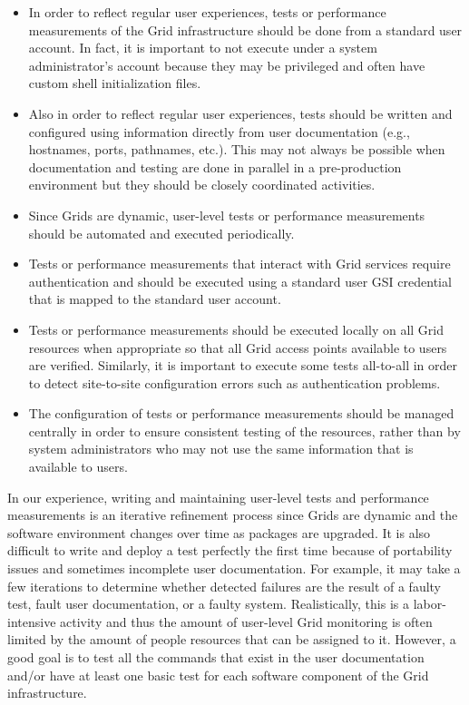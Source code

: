 \documentclass[times,10pt,twocolumn]{article}
\begin{document}
\begin{itemize}

\item In order to reflect regular user experiences, tests or performance
measurements of the Grid infrastructure should be done from a standard user
account.  In fact, it is important to not execute under a system
administrator's account because they may be privileged and often have custom
shell initialization files.

\item Also in order to reflect regular user experiences, tests should be
written and configured using information directly from user documentation
(e.g., hostnames, ports, pathnames, etc.).  This may not always be possible
when documentation and testing are done in parallel in a pre-production
environment but they should be closely coordinated activities. 

\item Since Grids are dynamic, user-level tests or performance measurements
should be automated and executed periodically.

\item Tests or performance measurements that interact with Grid services
require authentication and should be executed using a standard user GSI
credential that is mapped to the standard user account.  

\item Tests or performance measurements should be executed locally on all Grid
resources when appropriate so that all Grid access points available to users
are verified.  Similarly, it is important to execute some tests all-to-all
in order to detect site-to-site configuration errors such as authentication
problems.

\item The configuration of tests or performance measurements should be managed
centrally in order to ensure consistent testing of the resources, rather than
by system administrators who may not use the same information that is
available to users.

\end{itemize}

\noindent In our experience, writing and maintaining user-level tests and
performance measurements is an iterative refinement process since Grids are
dynamic and the software environment changes over time as packages are
upgraded.  It is also difficult to write and deploy a test perfectly the first
time because of portability issues and sometimes incomplete user
documentation.  For example, it may take a few iterations to determine whether
detected failures are the result of a faulty test, fault user documentation,
or a faulty system.  Realistically, this is a labor-intensive activity and
thus the amount of user-level Grid monitoring is often limited by the amount
of people resources that can be assigned to it.  However, a good goal is to
test all the commands that exist in the user documentation and/or have at
least one basic test for each software component of the Grid infrastructure.  
\end{document}
